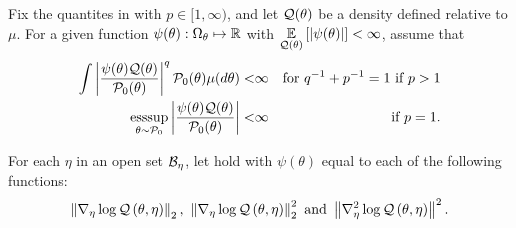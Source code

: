 \begin{assu}
%
Fix the quantites in  with $p \in [1, \infty)$, and let
$\mathcal{Q}(\theta)$ be a density defined relative to $\mu$.  For a given function
$\psi(\theta): \Omega_{\theta} \mapsto \mathbb{R}$ with
$\underset{\mathcal{Q}(\theta)}{\mathbb{E}}\left[\left|\psi(\theta)\right|\right] < \infty$, assume that
%
\begin{align*}
%
\int \abs{\frac{\psi(\theta) \q(\theta)}{\pbase(\theta)}}^q
\pbase(\theta) \mu(d\theta) <& \infty
    & \textrm{for }q^{-1} + p^{-1} = 1\textrm{ if }p > 1 \\
\esssup_{\theta \sim \pbase} \abs{\frac{\psi(\theta) \q(\theta)}{\pbase(\theta)}}
 <& \infty
    & \textrm{ if }p = 1.
%
\end{align*}
%
\end{assu}


\begin{assu}
%
For each $\eta$ in an open set $\mathcal{B}_\eta$, let  hold with
$\psi(\theta)$ equal to each of the following functions:
%
\begin{align*}
%
 \norm{\lqgrad{\theta, \eta}}_2 \textrm{, }
 \norm{\lqgrad{\theta, \eta}}^2_2 \textrm{ and }
 \norm{\lqhess{\theta, \eta}}^2.
%
\end{align*}
%
\end{assu}



